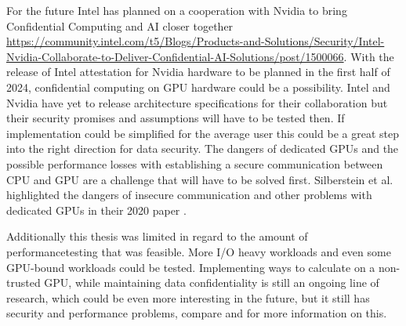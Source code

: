For the future Intel has planned on a cooperation with Nvidia to bring Confidential Computing and AI closer together \url{https://community.intel.com/t5/Blogs/Products-and-Solutions/Security/Intel-Nvidia-Collaborate-to-Deliver-Confidential-AI-Solutions/post/1500066}. With the release of Intel attestation for Nvidia hardware to be planned in the first half of 2024, confidential computing on GPU hardware could be a possibility. Intel and Nvidia have yet to release architecture specifications for their collaboration but their security promises and assumptions will have to be tested then. If implementation could be simplified for the average user this could be a great step into the right direction for data security. The dangers of dedicated GPUs and the possible performance losses with establishing a secure communication between CPU and GPU are a challenge that will have to be solved first. Silberstein et al. highlighted the dangers of insecure communication and other problems with dedicated GPUs in their 2020 paper \cite{Silberstein_GPUAttack}.

Additionally this thesis was limited in regard to the amount of performancetesting that was feasible. More I/O heavy workloads and even some GPU-bound workloads could be tested. Implementing ways to calculate on a non-trusted GPU, while maintaining data confidentiality is still an ongoing line of research, which could be even more interesting in the future, but it still has security and performance problems, compare \cite{Monique Ogburn} and \cite{Baiyu Li} for more information on this.


